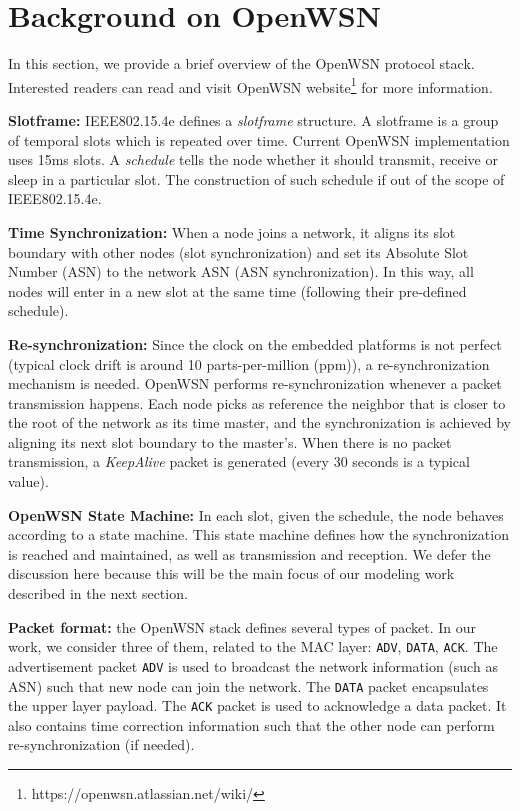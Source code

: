 \section{Background on OpenWSN}
\label{sec:background-openwsn}

In this section, we provide a brief overview of the OpenWSN protocol stack. Interested readers can read \cite{watteyne2012openwsn, IEEE802.15.4e} and visit OpenWSN website\footnote{https://openwsn.atlassian.net/wiki/} for more information. 

{\bf Slotframe:} IEEE802.15.4e defines a {\em slotframe} structure. A slotframe is a group of temporal slots which is repeated over time. Current OpenWSN implementation uses 15ms slots. A {\em schedule} tells the node whether it should transmit, receive or sleep in a particular slot. The construction of such schedule if out of the scope of IEEE802.15.4e.

{\bf Time Synchronization:} When a node joins a network, it aligns its slot boundary with other nodes (slot synchronization) and set its Absolute Slot Number (ASN) to the network ASN (ASN synchronization). In this way, all nodes will enter in a new slot at the same time (following their pre-defined schedule). 

{\bf Re-synchronization:} Since the clock on the embedded platforms is not perfect (typical clock drift is around 10 parts-per-million (ppm)), a re-synchronization mechanism is needed. OpenWSN performs re-synchronization whenever a packet transmission happens. Each node picks as reference the neighbor that is closer to the root of the network as its time master, and the synchronization is achieved by aligning its next slot boundary to the master's. When there is no packet transmission, a {\em KeepAlive} packet is generated (every 30 seconds is a typical value).

{\bf OpenWSN State Machine:} In each slot, given the schedule, the node behaves according to a state machine. This state machine defines how the synchronization is reached and maintained, as well as transmission and reception. We defer the discussion here because this will be the main focus of our modeling work described in the next section.

{\bf Packet format:} the OpenWSN stack defines several types of packet. In our work, we consider three of them, related to the MAC layer: \texttt{ADV}, \texttt{DATA}, \texttt{ACK}. The advertisement packet \texttt{ADV} is used to broadcast the network information (such as ASN) such that new node can join the network. The \texttt{DATA} packet encapsulates the upper layer payload. The \texttt{ACK} packet is used to acknowledge a data packet. It also contains time correction information such that the other node can perform re-synchronization (if needed).


